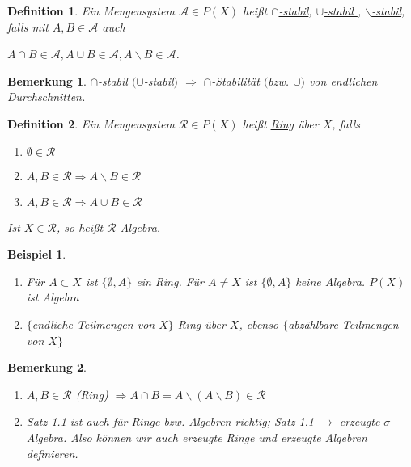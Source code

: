 \documentclass[11pt]{memoir}
\theoremstyle{changebreak}
\newtheorem{Definition}{Definition}[chapter]
\newtheorem{Bemerkung}{Bemerkung}[chapter]
\newtheorem{Beispiel}{Beispiel}[chapter]
\begin{document}
\begin{Definition}
Ein Mengensystem $\mathscr A \in P(X)$ heißt \underline{$\cap$-stabil}, \underline{ $\cup$-stabil }, \underline{$\backslash$-stabil}, falls mit $A, B \in \mathscr A$ auch 
\begin{center}
	$A \cap B \in \mathscr A, A \cup B \in \mathscr A, A\backslash B \in \mathscr A$.
\end{center}
\end{Definition}

\begin{Bemerkung}
$\cap$-stabil $(\cup$-stabil$)$ $\Rightarrow$ $\cap$-Stabilität $($bzw. $\cup)$ von endlichen Durchschnitten.
\end{Bemerkung}

\begin{Definition}
Ein Mengensystem $\mathscr R \in P(X)$ heißt \underline{Ring} über $X$, falls
\begin{enumerate}
	\item $\emptyset \in \mathscr R$
	\item $A, B \in \mathscr R \Rightarrow A\backslash B \in \mathscr R$
	\item $A, B \in \mathscr R \Rightarrow A \cup B \in \mathscr R$
\end{enumerate}
Ist $X \in \mathscr R$, so heißt $\mathscr R$ \underline{Algebra}.
\end{Definition}


\begin{Beispiel}
\begin{enumerate}
	\item Für $A \subset X$ ist $\{\emptyset, A\}$ ein Ring. Für $A \ne X$ ist $\{\emptyset, A\}$ keine Algebra. $P(X)$ ist Algebra
	\item $\{$endliche Teilmengen von $X\}$ Ring über $X$, ebenso $\{ $abzählbare Teilmengen von $X\}$
\end{enumerate}
\end{Beispiel}

\begin{Bemerkung}
\begin{enumerate}
	\item $A, B \in \mathscr R$ (Ring) $\Rightarrow A \cap B = A \backslash (A \backslash B) \in \mathscr R$
	 \item Satz 1.1 ist auch für Ringe bzw. Algebren richtig; Satz 1.1 $\rightarrow$ erzeugte $\sigma$-Algebra. Also können wir auch erzeugte Ringe und erzeugte Algebren definieren.
\end{enumerate}
\end{Bemerkung}
\end{document}
